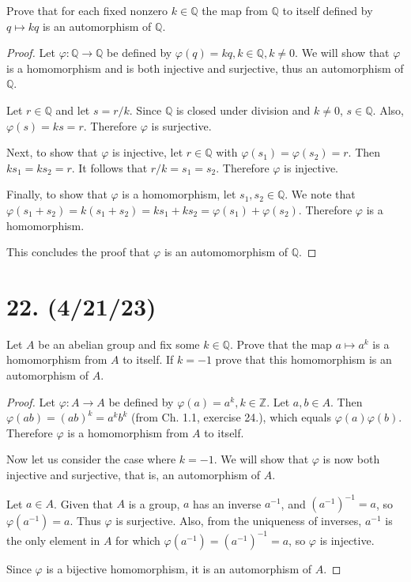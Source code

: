 \documentclass{article}
\begin{document}
Prove that for each fixed nonzero $k \in \mathbb{Q}$ the map from $\mathbb{Q}$ to itself defined by $q \mapsto kq$ is an automorphism of $\mathbb{Q}$.

\begin{proof}
    Let $\varphi: \mathbb{Q} \rightarrow \mathbb{Q}$ be defined by $\varphi(q) = kq, k \in \mathbb{Q}, k \neq 0$. We will show that $\varphi$ is a homomorphism and is both injective and surjective, thus an automorphism of $\mathbb{Q}$.

    Let $r \in \mathbb{Q}$ and let $s = r / k$. Since $\mathbb{Q}$ is closed under division and $k \neq 0$, $s \in \mathbb{Q}$. Also, $\varphi(s) = ks = r$. Therefore $\varphi$ is surjective.

    Next, to show that $\varphi$ is injective, let $r \in \mathbb{Q}$ with $\varphi(s_1) = \varphi(s_2) = r$. Then $k s_1 = k s_2 = r$. It follows that $r / k = s_1 = s_2$. Therefore $\varphi$ is injective.

    Finally, to show that $\varphi$ is a homomorphism, let $s_1, s_2 \in \mathbb{Q}$. We note that $\varphi(s_1 + s_2) = k (s_1 + s_2) = k s_1 + k s_2 = \varphi(s_1) + \varphi(s_2)$. Therefore $\varphi$ is a homomorphism.

    This concludes the proof that $\varphi$ is an automomorphism of $\mathbb{Q}$.
\end{proof}

\section*{22. (4/21/23)}

Let $A$ be an abelian group and fix some $k \in \mathbb{Q}$. Prove that the map $a \mapsto a^k$ is a homomorphism from $A$ to itself. If $k = -1$ prove that this homomorphism is an automorphism of $A$.

\begin{proof}
    Let $\varphi: A \rightarrow A$ be defined by $\varphi(a) = a^k, k \in \mathbb{Z}$. Let $a, b \in A$. Then $\varphi(a b) = (ab)^k = a^k b^k$ (from Ch. 1.1, exercise 24.), which equals $\varphi(a) \varphi(b)$. Therefore $\varphi$ is a homomorphism from $A$ to itself.

    Now let us consider the case where $k = -1$. We will show that $\varphi$ is now both injective and surjective, that is, an automorphism of $A$.

    Let $a \in A$. Given that $A$ is a group, $a$ has an inverse $a^{-1}$, and $(a^{-1})^{-1} = a$, so $\varphi(a^{-1}) = a$. Thus $\varphi$ is surjective. Also, from the uniqueness of inverses, $a^{-1}$ is the only element in $A$ for which $\varphi(a^{-1}) = (a^{-1})^{-1} = a$, so $\varphi$ is injective.

    Since $\varphi$ is a bijective homomorphism, it is an automorphism of $A$.
\end{proof}
\end{document}
